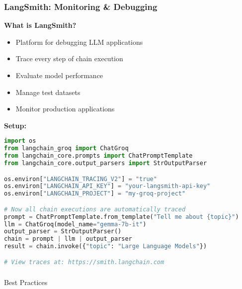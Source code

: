 \begin{frame}[fragile]\frametitle{LangSmith: Monitoring \& Debugging}

\textbf{What is LangSmith?}
\begin{itemize}
\item Platform for debugging LLM applications
\item Trace every step of chain execution
\item Evaluate model performance
\item Manage test datasets
\item Monitor production applications
\end{itemize}

\textbf{Setup:}
\begin{lstlisting}[language=python, basicstyle=\tiny]
import os
from langchain_groq import ChatGroq
from langchain_core.prompts import ChatPromptTemplate
from langchain_core.output_parsers import StrOutputParser

os.environ["LANGCHAIN_TRACING_V2"] = "true"
os.environ["LANGCHAIN_API_KEY"] = "your-langsmith-api-key"
os.environ["LANGCHAIN_PROJECT"] = "my-groq-project"

# Now all chain executions are automatically traced
prompt = ChatPromptTemplate.from_template("Tell me about {topic}")
llm = ChatGroq(model_name="gemma-7b-it")
output_parser = StrOutputParser()
chain = prompt | llm | output_parser
result = chain.invoke({"topic": "Large Language Models"})

# View traces at: https://smith.langchain.com
\end{lstlisting}

\end{frame}

\begin{frame}[fragile]\frametitle{}
\begin{center}
{\Large Best Practices}
\end{center}
\end{frame}

